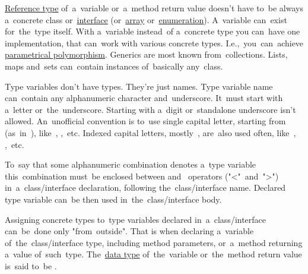 \label{javagenerics}
\hyperref[javareferencetypes]{Reference type} of~a~variable or~a~method return value doesn't have to~be always a~concrete class or~\hyperref[javainterfaces]{interface} (or~\hyperref[javaarray]{array} or~\hyperref[javaenum]{enumeration}).
A~variable can~exist for~the~type itself.
With a~variable instead~of a~concrete type you can~have one implementation, that can~work with various concrete types.
I.e.,~you~can~achieve \hyperref[polymorphism]{parametrical polymorphism}.
Generics are most known from~collections.
Lists, maps and~sets can~contain instances of~basically any~class.

Type variables don't have types.
They're just names.
Type variable name can~contain any alphanumeric character and~underscore.
It~must start with a~letter or~the~underscore.
Starting with a~digit or~standalone underscore isn't allowed.
An~unofficial convention is to~use single capital letter, starting from~ \mbox{(as in )}, like~, \mbox{,  etc.}
Indexed capital letters, mostly~, are~also used often, like~, \mbox{,  etc.}

To~say that some alphanumeric combination denotes a~type variable this~combination must~be enclosed between  and~ operators \mbox{("<" and ">")} in~a~class/interface declaration, following the~class/interface name.
Declared type variable can~be then used in~the~class/interface body.

Assigning concrete types to~type variables declared in~a~class/interface can~be~done only \mbox{"from outside"}.
That is when declaring a~variable of~the~class/interface type, including method parameters, or~a~method returning a~value of~such~type.
The~\hyperref[datatypes]{data type} of~the~variable or~the~method return value is~said to~be .
\newpage


